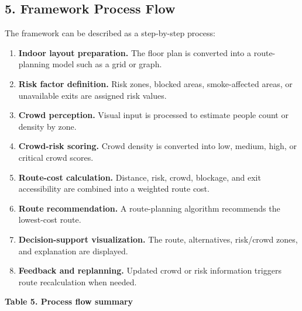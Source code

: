 \documentclass[
]{article}
\providecommand{\tightlist}{%
  \setlength{\itemsep}{0pt}\setlength{\parskip}{0pt}}
\begin{document}
\subsection{5. Framework Process Flow}\label{framework-process-flow}

The framework can be described as a step-by-step process:

\begin{enumerate}
\def\labelenumi{\arabic{enumi}.}
\tightlist
\item
  \textbf{Indoor layout preparation.} The floor plan is converted into a
  route-planning model such as a grid or graph.
\item
  \textbf{Risk factor definition.} Risk zones, blocked areas,
  smoke-affected areas, or unavailable exits are assigned risk values.
\item
  \textbf{Crowd perception.} Visual input is processed to estimate
  people count or density by zone.
\item
  \textbf{Crowd-risk scoring.} Crowd density is converted into low,
  medium, high, or critical crowd scores.
\item
  \textbf{Route-cost calculation.} Distance, risk, crowd, blockage, and
  exit accessibility are combined into a weighted route cost.
\item
  \textbf{Route recommendation.} A route-planning algorithm recommends
  the lowest-cost route.
\item
  \textbf{Decision-support visualization.} The route, alternatives,
  risk/crowd zones, and explanation are displayed.
\item
  \textbf{Feedback and replanning.} Updated crowd or risk information
  triggers route recalculation when needed.
\end{enumerate}

\textbf{Table 5. Process flow summary}
\end{document}
